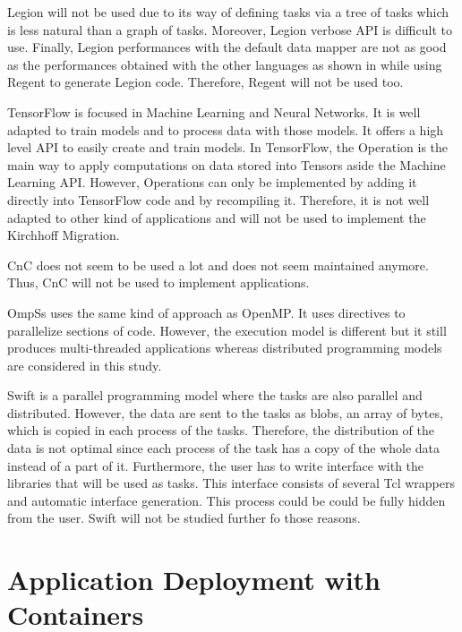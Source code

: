 Legion will not be used due to its way of defining tasks via a tree of tasks which is less natural than a graph of tasks.
Moreover, Legion verbose API is difficult to use.
Finally, Legion performances with the default data mapper are not as good as the performances obtained with the other languages as shown in \cite{GurhP2020} while using Regent to generate Legion code.
Therefore, Regent will not be used too.


TensorFlow is focused in Machine Learning and Neural Networks.
It is well adapted to train models and to process data with those models.
It offers a high level API to easily create and train models.
In TensorFlow, the Operation is the main way to apply computations on data stored into Tensors aside the Machine Learning API.
However, Operations can only be implemented by adding it directly into TensorFlow code and by recompiling it.
Therefore, it is not well adapted to other kind of applications and will not be used to implement the Kirchhoff Migration.

CnC does not seem to be used a lot and does not seem maintained anymore.
Thus, CnC will not be used to implement applications.

OmpSs uses the same kind of approach as OpenMP.
It uses directives to parallelize sections of code.
However, the execution model is different but it still produces multi-threaded applications whereas distributed programming models are considered in this study.

Swift is a parallel programming model where the tasks are also parallel and distributed.
However, the data are sent to the tasks as blobs, an array of bytes, which is copied in each process of the tasks.
Therefore, the distribution of the data is not optimal since each process of the task has a copy of the whole data instead of a part of it.
Furthermore, the user has to write interface with the libraries that will be used as tasks.
This interface consists of several Tcl wrappers and automatic interface generation.
This process could be could be fully hidden from the user.
Swift will not be studied further fo those reasons.

\section{Application Deployment with Containers}
